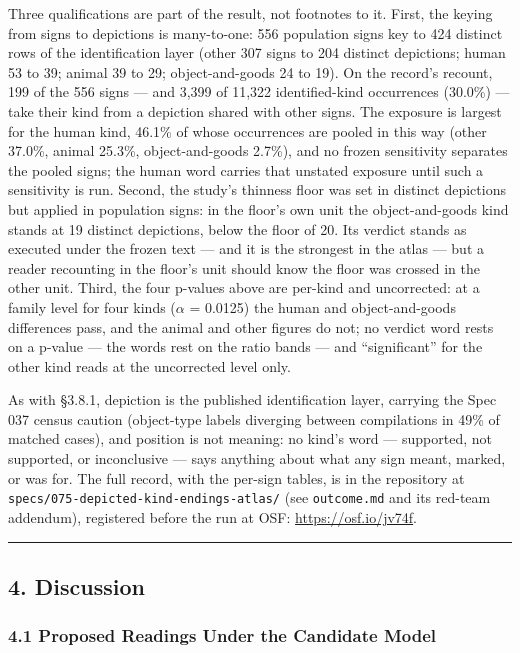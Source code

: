 \documentclass[
]{article}
\begin{document}
Three qualifications are part of the result, not footnotes to
it. First, the keying from signs to depictions is many-to-one: 556 population signs key to 424 distinct rows of the identification layer (other 307 signs to 204 distinct depictions; human 53 to 39; animal 39 to 29; object-and-goods 24 to 19). On the record's recount, 199 of the 556 signs --- and 3,399 of 11,322 identified-kind occurrences (30.0\%) --- take their kind from a depiction shared with other signs. The exposure is largest
for the human kind, 46.1\% of whose occurrences are pooled in
this way (other 37.0\%, animal 25.3\%, object-and-goods
2.7\%), and no frozen sensitivity separates the pooled signs;
the human word carries that unstated exposure until such a
sensitivity is run. Second, the study's thinness floor was set
in distinct depictions but applied in population signs: in the
floor's own unit the object-and-goods kind stands at 19
distinct depictions, below the floor of 20. Its verdict stands
as executed under the frozen text --- and it is the strongest
in the atlas --- but a reader recounting in the floor's unit
should know the floor was crossed in the other unit. Third,
the four p-values above are per-kind and uncorrected: at a
family level for four kinds ($\alpha$ = 0.0125) the human and
object-and-goods differences pass, and the animal and other
figures do not; no verdict word rests on a p-value --- the
words rest on the ratio bands --- and ``significant'' for the
other kind reads at the uncorrected level only.

As with §3.8.1, depiction is the published identification
layer, carrying the Spec 037 census caution (object-type
labels diverging between compilations in 49\% of matched
cases), and position is not meaning: no kind's word ---
supported, not supported, or inconclusive --- says anything
about what any sign meant, marked, or was for. The full
record, with the per-sign tables, is in the repository at
\texttt{specs/075-depicted-kind-endings-atlas/} (see
\texttt{outcome.md} and its red-team addendum), registered
before the run at OSF: \url{https://osf.io/jv74f}.


\begin{center}\rule{0.5\linewidth}{0.5pt}\end{center}

\subsection{4. Discussion}\label{discussion}

\subsubsection{4.1 Proposed Readings Under the Candidate Model}\label{proposed-readings-candidate-model}
\end{document}

